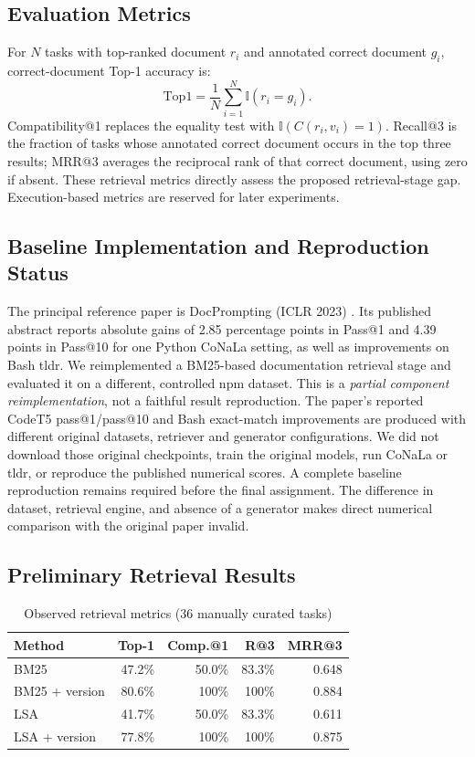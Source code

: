 \documentclass[conference]{IEEEtran}
\begin{document}
\subsection{Evaluation Metrics}
For $N$ tasks with top-ranked document $r_i$ and annotated correct document $g_i$, correct-document Top-1 accuracy is:
\begin{equation}
\mathrm{Top1}=\frac{1}{N}\sum_{i=1}^{N}\mathbb{I}(r_i=g_i).
\end{equation}
Compatibility@1 replaces the equality test with $\mathbb{I}(C(r_i,v_i)=1)$. Recall@3 is the fraction of tasks whose annotated correct document occurs in the top three results; MRR@3 averages the reciprocal rank of that correct document, using zero if absent. These retrieval metrics directly assess the proposed retrieval-stage gap. Execution-based metrics are reserved for later experiments.

\subsection{Baseline Implementation and Reproduction Status}
The principal reference paper is DocPrompting (ICLR 2023) \cite{docprompting}. Its published abstract reports absolute gains of 2.85 percentage points in Pass@1 and 4.39 points in Pass@10 for one Python CoNaLa setting, as well as improvements on Bash tldr. We reimplemented a BM25-based documentation retrieval stage and evaluated it on a different, controlled npm dataset. This is a \emph{partial component reimplementation}, not a faithful result reproduction. The paper's reported CodeT5 pass@1/pass@10 and Bash exact-match improvements are produced with different original datasets, retriever and generator configurations. We did not download those original checkpoints, train the original models, run CoNaLa or tldr, or reproduce the published numerical scores. A complete baseline reproduction remains required before the final assignment. The difference in dataset, retrieval engine, and absence of a generator makes direct numerical comparison with the original paper invalid.

\subsection{Preliminary Retrieval Results}
\begin{table}[t]
\centering
\caption{Observed retrieval metrics (36 manually curated tasks)}
\label{tab:results}
\setlength{\tabcolsep}{3pt}
\begin{tabular}{lrrrr}
\toprule
Method & Top-1 & Comp.@1 & R@3 & MRR@3\\
\midrule
BM25 & 47.2\% & 50.0\% & 83.3\% & 0.648\\
BM25 + version & 80.6\% & 100\% & 100\% & 0.884\\
LSA & 41.7\% & 50.0\% & 83.3\% & 0.611\\
LSA + version & 77.8\% & 100\% & 100\% & 0.875\\
\bottomrule
\end{tabular}
\end{table}
\end{document}
